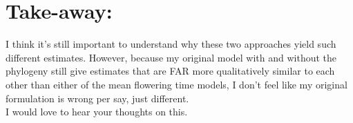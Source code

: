 \documentclass{article}\usepackage[]{graphicx}\usepackage[]{color}
\begin{document}
\section{Take-away:}
I think it's still important to understand why these two approaches yield such different estimates. However, because my original model with and without the phylogeny still give estimates that are FAR more qualitatively similar to each other than either of the mean flowering time models, I don't feel like my original formulation is wrong per say, just different.\\

I would love to hear your thoughts on this.
\end{document}
